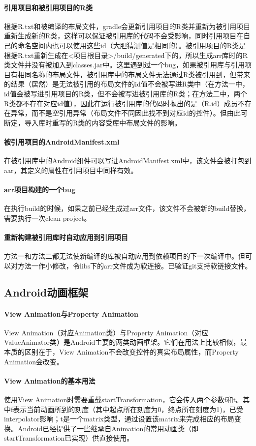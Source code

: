 \documentclass[UTF8]{ctexart}
\begin{document}
    \paragraph{引用项目和被引用项目的R类}
    根据R.txt和被编译的布局文件，gradle会更新引用项目的R类并重新为被引用项目重新生成新的R类，这样可以保证被引用库的代码不会受影响，同时引用项目在自己的命名空间内也可以使用这些id（大胆猜测值是相同的）。被引用项目的R类是根据R.txt重新生成在<项目根目录>/build/generated下的，所以生成arr库时的R类文件并没有被加入到classes.jar中。这里遇到过一个bug，如果被引用库与引用项目有相同名称的布局文件，被引用库中的布局文件无法通过R类被引用到，但带来的结果（居然）是无法被引用的布局文件的id值不会被写进R类中（在方法一中，id值会被写进引用项目的R类，但不会被写进被引用库的R类；在方法二中，两个R类都不存在对应id值），因此在运行被引用库的代码时抛出的是（R.id）成员不存在异常，而不是空引用异常（布局文件不同因此找不到对应id的控件）。但由此可断定，导入库时重写的R类的内容受库中布局文件的影响。
    \paragraph{被引用项目的AndroidManifest.xml}
    在被引用库中的Android组件可以写进AndroidManifest.xml中，该文件会被打包到aar，其定义的属性在引用项目中同样有效。
    \paragraph{arr项目构建的一个bug}
    在执行build的时候，如果之前已经生成过arr文件，该文件不会被新的build替换，需要执行一次clean project。
    \paragraph{重新构建被引用库时自动应用到引用项目}
    方法一和方法二都无法使新编译的库被自动应用到依赖项目的下一次编译中。但可以对方法一作小修改，令libs下的arr文件成为软连接。已验证git支持软链接文件。
    \subsection{Android动画框架}
    \paragraph{View Animation与Property Animation}
    View Animation（对应Animation类）与Property Animation（对应ValueAnimator类）是Android主要的两类动画框架。它们在用法上比较相似，最本质的区别在于，View Animation不会改变控件的真实布局属性，而Property Animation会改变。
    \paragraph{View Animation的基本用法}
    使用View Animation时需要重载startTransformation，它会传入两个参数f和t。其中f表示当前动画所到的刻度（其中起点所在刻度为0，终点所在刻度为1)，已受interpolator影响；t是一个matrix类型，通过设置该matrix来完成相应的布局变换。Android已经提供了一些继承自Animation的常用动画类（即startTransformation已实现）供直接使用。
\end{document}
